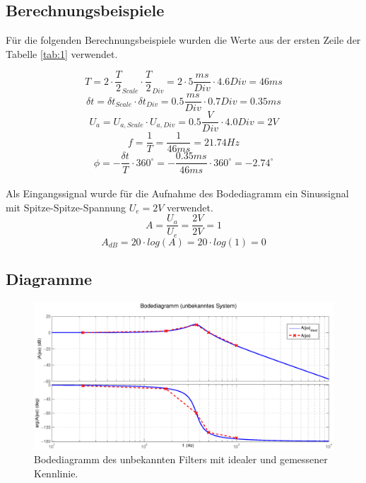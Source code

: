 \documentclass[12pt,a4paper,ngerman]{article}
\begin{document}
\subsection{Berechnungsbeispiele}
Für die folgenden Berechnungsbeispiele wurden die Werte aus der ersten Zeile der Tabelle \ref{tab:1} verwendet.

\begin{equation}
T = 2 \cdot \frac{T}{2}_{Scale} \cdot \frac{T}{2}_{Div} = 2 \cdot 5\frac{ms}{Div} \cdot 4.6 Div = 46ms
\end{equation}
\begin{equation}
\delta t = \delta t_{Scale} \cdot \delta t_{Div} = 0.5\frac{ms}{Div} \cdot 0.7Div = 0.35ms
\end{equation}
\begin{equation}
U_a = U_{a,Scale} \cdot U_{a,Div} = 0.5\frac{V}{Div} \cdot 4.0Div = 2V
\end{equation}
\begin{equation}
f = \frac{1}{T} = \frac{1}{46ms} = 21.74Hz
\end{equation}
\begin{equation}
\phi = - \frac{\delta t}{T} \cdot 360^\circ = -\frac{0.35ms}{46ms	} \cdot 360^\circ = -2.74^\circ
\end{equation}\\
Als Eingangssignal wurde für die Aufnahme des Bodediagramm ein Sinussignal mit Spitze-Spitze-Spannung $U_e = 2V$ verwendet.
\begin{equation}
A = \frac{U_a}{U_e} = \frac{2V}{2V} = 1
\end{equation}
\begin{equation}
A_{dB} = 20 \cdot log(A) = 20 \cdot log(1) = 0
\end{equation}


\subsection{Diagramme}
\begin{figure}[H]
\centering
\includegraphics[width=1.2\textwidth]{figures/bode_unbekannt.eps} 
\caption{Bodediagramm des unbekannten Filters mit idealer und gemessener Kennlinie.}
\label{fig:bode_unb}
\end{figure}
\end{document}
